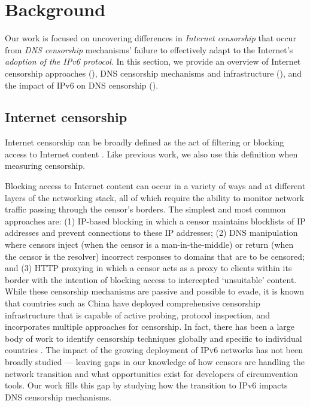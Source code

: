 \section{Background}\label{sec:background}



Our work is focused on uncovering differences in {\em Internet censorship} that occur
from {\em DNS censorship} mechanisms' failure to effectively adapt to the Internet's
{\em adoption of the IPv6 protocol}. In this section, we provide an overview of
Internet censorship approaches (), DNS
censorship mechanisms and infrastructure (), and the
impact of IPv6 on DNS censorship ().

\subsection{Internet censorship}\label{sec:background:censorship}

Internet censorship can be broadly defined as the act of filtering or blocking
access to Internet content \cite{townsend}. Like previous work, we also use
this definition when measuring censorship.

%
Blocking access to Internet content can occur in a variety of ways and at
different layers of the networking stack, all of which require the ability to
monitor network traffic passing through the censor's borders. The simplest and
most common approaches are: (1) IP-based blocking in which a censor maintains
blocklists of IP addresses and prevent connections to these IP addresses; (2)
DNS manipulation where censors inject (when the censor is a man-in-the-middle)
or return (when the censor is the resolver) incorrect responses to domains that
are to be censored; and (3) HTTP proxying in which a censor acts as a proxy to
clients within its border with the intention of blocking access to intercepted
`unsuitable' content.
%
While these censorship mechanisms are passive and possible to evade, it is
known that countries such as China have deployed comprehensive censorship
infrastructure that is capable of active probing, protocol inspection, and
incorporates multiple approaches for censorship.
%
In fact, there has been a large body of work to identify censorship techniques
globally
\cite{pearce2017global, niaki2020iclab, scott2016satellite,
sundara2020censored, filasto2012ooni, pearce2017augur, razaghpanah2016exploring}
and specific to individual countries \cite{USESEC21:GFWatch, aryan2013internet,
ramesh2020decentralized, yadav2018light, gebhart2017internet, nabi2013anatomy}.
%
The impact of the growing deployment of IPv6 networks has not been broadly
studied --- leaving gaps in our knowledge of how censors are handling the
network transition and what opportunities exist for developers of circumvention
tools. Our work fills this gap by studying how the transition to IPv6 impacts
DNS censorship mechanisms.


